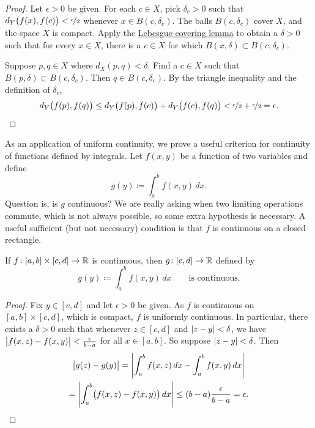 \begin{proof}
Let $\epsilon > 0$ be given.  For each $c \in X$, pick $\delta_c > 0$ such that
$d_Y\bigl(f(x),f(c)\bigr) < \nicefrac{\epsilon}{2}$
whenever
$x \in B(c,\delta_c)$.
The balls
$B(c,\delta_c)$ cover $X$, and the space $X$ is compact.  
Apply the \hyperref[ms:lebesgue]{Lebesgue covering lemma} to obtain a 
$\delta > 0$ such that for every $x \in X$, there is a $c \in X$
for which $B(x,\delta) \subset B(c,\delta_c)$.

Suppose $p, q \in X$ where $d_X(p,q) < \delta$.
Find a $c \in X$ such that $B(p,\delta) \subset B(c,\delta_c)$.
Then $q \in B(c,\delta_c)$.  By the triangle inequality
and the definition of $\delta_c$,
\begin{equation*}
d_Y\bigl(f(p),f(q)\bigr)
\leq
d_Y\bigl(f(p),f(c)\bigr)
+
d_Y\bigl(f(c),f(q)\bigr)
<
\nicefrac{\epsilon}{2}+
\nicefrac{\epsilon}{2} = \epsilon .  \qedhere
\end{equation*}
\end{proof}

As an application of uniform continuity,
we prove a useful criterion for
continuity of functions defined by integrals.
Let $f(x,y)$ be a function of two variables and define
\begin{equation*}
g(y) \coloneqq \int_a^b f(x,y) \,dx .
\end{equation*}
Question is, is $g$ continuous?
We are really asking when two limiting operations commute,
which is not always possible, so some extra hypothesis
is necessary.  A useful sufficient (but not
necessary) condition is that $f$ is continuous on a closed rectangle.

\begin{prop} \label{prop:integralcontcont}
If $f \colon [a,b] \times [c,d] \to {\mathbb{R}}$ is continuous,
then $g \colon [c,d] \to {\mathbb{R}}$ defined by
\begin{equation*}
g(y) \coloneqq \int_a^b f(x,y) \,dx  \qquad \text{is continuous}.
\end{equation*}
\end{prop}

\begin{proof}
Fix $y \in [c,d]$ and
let $\epsilon > 0$ be given.
As $f$ is continuous on $[a,b] \times [c,d]$, which is compact, $f$
is uniformly continuous.  
In particular, there exists a $\delta > 0$ such that
whenever $z \in [c,d]$ and
$\lvert {z-y} \rvert < \delta$, we have
$\bigl\lvert {f(x,z)-f(x,y)} \bigr\rvert < \frac{\epsilon}{b-a}$ for all $x \in [a,b]$.
So suppose $\lvert {z-y} \rvert < \delta$.  Then
\begin{multline*}
\bigl\lvert {
g(z)-
g(y)
} \bigr\rvert
=
\left\lvert {
\int_a^b 
f(x,z) \,dx 
-
\int_a^b 
f(x,y) \,dx 
} \right\rvert
\\
=
\left\lvert {
\int_a^b 
\bigl(
f(x,z) - f(x,y)
\bigr)
\,dx 
} \right\rvert
\leq
(b-a)
\frac{\epsilon}{b-a}
= \epsilon . \qedhere
\end{multline*}
\end{proof}

